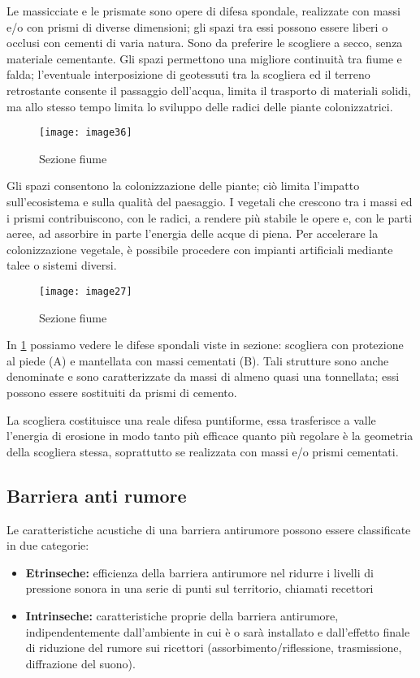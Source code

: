 Le massicciate e le prismate sono opere di difesa spondale, realizzate con massi e/o con prismi di diverse dimensioni; gli spazi tra essi possono essere liberi o occlusi con cementi di varia natura. Sono da preferire le scogliere a secco, senza materiale cementante. Gli spazi permettono una migliore continuità tra fiume e falda; l'eventuale interposizione di geotessuti tra la scogliera ed il terreno retrostante consente il passaggio dell'acqua, limita il trasporto di materiali solidi, ma allo stesso tempo limita lo sviluppo delle radici delle piante colonizzatrici. 

\begin{figure}[H]
	\centering
	\texttt{[image: image36]}
	\caption{Sezione fiume}
	\label{fig:spnde}
\end{figure}

\noindent

Gli spazi consentono la colonizzazione delle piante; ciò limita l’impatto sull'ecosistema e sulla qualità del paesaggio. I vegetali che crescono tra i massi ed i prismi contribuiscono, con le radici, a rendere più stabile le opere e, con le parti aeree, ad assorbire in parte l’energia delle acque di piena. Per accelerare la colonizzazione vegetale, è possibile procedere con impianti artificiali mediante talee o sistemi diversi. \\

\begin{wrapfigure}[12]{r}{0.4\textwidth}
	\centering
	\texttt{[image: image27]}
	\caption{Sezione fiume}
\end{wrapfigure}

In \cref{fig:spnde} possiamo vedere le difese spondali viste in sezione: scogliera con protezione al piede (A) e mantellata con massi cementati (B). Tali strutture sono anche denominate  e sono caratterizzate da massi di almeno quasi una tonnellata; essi possono essere sostituiti da prismi di cemento. 


La scogliera costituisce una reale difesa puntiforme, essa trasferisce a valle l’energia di erosione in modo tanto più efficace quanto più regolare è la geometria della scogliera stessa, soprattutto se realizzata con massi e/o prismi cementati. \todo

\subsection{Barriera anti rumore}

Le caratteristiche acustiche di una barriera antirumore possono essere classificate in due categorie: 
\begin{itemize}
	\item \textbf{Etrinseche:} efficienza della barriera antirumore nel ridurre i livelli di pressione sonora in una serie di punti sul territorio, chiamati recettori
	\item \textbf{Intrinseche:} caratteristiche proprie della barriera antirumore, indipendentemente dall'ambiente in cui è o sarà installato e dall'effetto finale di riduzione del rumore sui ricettori (assorbimento/riflessione, trasmissione, diffrazione del suono).
\end{itemize}

